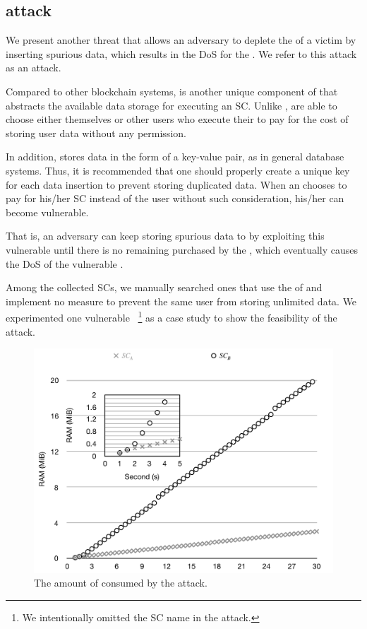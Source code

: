 \subsection{\SCPDOS attack}
\label{SCPDOS}


We present another threat that allows an adversary to deplete the \ram of a
victim \SCP by inserting spurious data, which results in the DoS for the \SCP.
We refer to this attack as an \textit{\SCPDOS} attack.

Compared to other blockchain systems, \ram is another unique component of \eos
that abstracts the available data storage for executing an SC. Unlike \cpu,
\SCPs are able to choose either themselves or other users who execute their \SCs
to pay for the cost of storing user data without any permission.

In addition, \eos stores data in the form of a key-value pair, as in general
database systems. Thus, it is recommended that one should properly create a
unique key for each data insertion to prevent storing duplicated data.
%
When an \SCP chooses to pay for his/her SC instead of the user without such
consideration, his/her \SC can become vulnerable.

That is, an adversary can keep storing spurious data to \ram by exploiting this
vulnerable \SC until there is no remaining \ram purchased by the \SCP, which
eventually causes the DoS of the vulnerable \SC.

Among the collected SCs, we manually searched ones that use the \ram of \SCPs
and implement no measure to prevent the same user from storing unlimited data.
We experimented one vulnerable \SC~\footnote{We intentionally omitted the SC
name in the \SCPDOS attack.} as a case study to show the feasibility of the
\SCPDOS attack.
%

\begin{figure}[!t] %
\centering
  \includegraphics[width=0.8\linewidth]{figures/CREAT2.pdf}
  \caption{The amount of \ram consumed by the \SCPDOS attack.}
  \label{fig:scpdos}
\end{figure}


